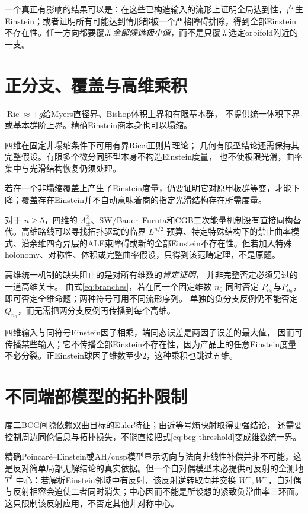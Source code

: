 \documentclass[UTF8,a4paper,11pt,fontset=fandol]{ctexart}
\numberwithin{equation}{section}
\theoremstyle{definition}
\newcommand{\Ric}{\operatorname{Ric}}
\begin{document}
一个真正有影响的结果可以是：在这些已构造输入的流形上证明全局达到性，产生Einstein；或者证明所有可能达到情形都被一个严格障碍排除，得到全部Einstein不存在性。任一方向都要覆盖\emph{全部候选极小值}，而不是只覆盖选定orbifold附近的一支。

\section{正分支、覆盖与高维乘积}
$\Ric\approx+g$给Myers直径界、Bishop体积上界和有限基本群，
不提供统一体积下界或基本群阶上界。精确Einstein商本身也可以塌缩。

四维在固定非塌缩条件下可用有界Ricci正则片理论\cite{CN}；
几何有限型结论还需保持其完整假设。有限多个微分同胚型本身不构造Einstein度量，
也不使极限光滑，曲率集中与光滑结构恢复仍须处理。

若在一个非塌缩覆盖上产生了Einstein度量，仍要证明它对原甲板群等变，才能下降；覆盖存在Einstein并不自动意味着商的指定光滑结构存在所需度量。

对于 $n\ge5$，四维的 $\Lambda^2_\pm$、SW/Bauer--Furuta和CGB二次能量机制没有直接同构替代。高维路线可以寻找拓扑驱动的临界 $L^{n/2}$ 预算、特定特殊结构下的禁止曲率模式、沿余维四奇异层的ALE束障碍或新的全部Einstein不存在性。但若加入特殊holonomy、对称性、体积或完整曲率假设，只得到该范畴定理，不是原题。

高维统一机制的缺失阻止的是对所有维数的\emph{肯定证明}，
并非完整否定必须另过的一道高维关卡。
由式\eqref{eq:branches}，若在同一个固定维数 $n_0$ 同时否定
$P_{n_0}^+$与$P_{n_0}^-$，即可否定全维命题；两种符号可用不同流形序列。
单独的负分支反例仍不能否定 $Q_{n_0}$，而无需把两分支反例再传播到每个高维。

四维输入与同符号Einstein因子相乘，端同态误差是两因子误差的最大值，
因而可传播某些输入；它不传播全部Einstein不存在性，因为产品上的任意Einstein度量
不必分裂。正Einstein球因子维数至少2，这种乘积也跳过五维。


\section{不同端部模型的拓扑限制}
度二BCG间隙依赖双曲目标的Euler特征；由近等号熵映射取得更强结论，
还需要控制周边同伦信息与拓扑损失，不能直接把式\eqref{eq:bcg-threshold}变成维数统一界。

精确Poincar\'e--Einstein或AH/cusp模型显示切向与法向非线性补偿并非不可能，这是反对简单局部无解结论的真实依据。但一个自对偶模型未必提供可反射的全测地 $T^3$ 中心：若解析Einstein邻域中有反射，该反射逆转取向并交换 $W^+,W^-$，自对偶与反射相容会迫使二者同时消失；中心因而不能是所设想的紧致负常曲率三环面。这只限制该反射应用，不否定其他非对称中心。
\end{document}
